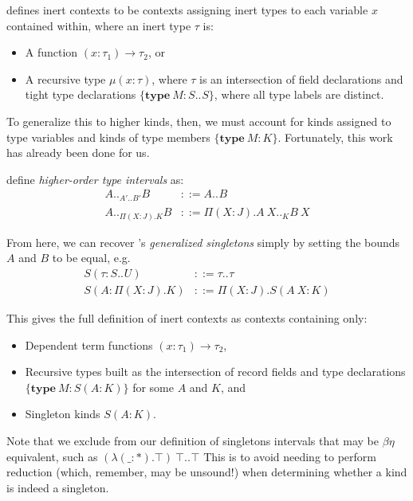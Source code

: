 \documentclass[a4paper, 10pt]{article}
\newcommand{\interval}[3][]{#2 .._{#1} #3}
\newcommand{\KDepArr}[3]{\Pi(#1:#2).#3}
\newcommand{\TDepArr}[3]{(#1:#2) \rightarrow #3}
\newcommand{\objtyp}[3]{\{ \textbf{#1}\ #2 : #3 \}}
\begin{document}
\citet{rapoport2017} defines inert contexts to be contexts assigning inert
types to each variable $x$ contained within, where an inert type $\tau$ is:

\begin{itemize}
  \item A function $\TDepArr{x}{\tau_1}{\tau_2}$, or
  \item A recursive type $\mu(x: \tau)$, where $\tau$ is an intersection of
    field declarations and tight type declarations
    $\objtyp{type}{M}{\interval{S}{S}}$, where all type labels are distinct.
\end{itemize}

To generalize this to higher kinds, then, we must account for kinds assigned to
type variables and kinds of type members $\objtyp{type}{M}{K}$. Fortunately,
this work has already been done for us.

\citet{stucki2021} define \emph{higher-order type intervals} as:
\begin{align*}
  \interval[\interval{A'}{B'}]{A}{B} &::= \interval{A}{B} \\
  \interval[\KDepArr{X}{J}{K}]{A}{B} &::=
    \KDepArr{X}{J}{\interval[K]{A\ X}{B\ X}}
\end{align*}

From here, we can recover \citet{stoneharper2000}'s \emph{generalized
singletons} simply by setting the bounds $A$ and $B$ to be equal, e.g.
\begin{align*}
  S(\tau : \interval{S}{U}) &::= \interval{\tau}{\tau} \\
  S(A : \KDepArr{X}{J}{K}) &::= \KDepArr{X}{J}{S(A\ X : K)}
\end{align*}

This gives the full definition of inert contexts as contexts containing only:
\begin{itemize}
  \item Dependent term functions $\TDepArr{x}{\tau_1}{\tau_2}$,
  \item Recursive types built as the intersection of record fields and type
    declarations $\objtyp{type}{M}{S(A : K)}$ for some $A$ and $K$, and
  \item Singleton kinds $S(A : K)$.
\end{itemize}

Note that we exclude from our definition of singletons intervals that may be
$\beta\eta$ equivalent, such as $\interval{(\lambda (\_:*).\top)\ \top}{\top}$
This is to avoid needing to perform reduction (which, remember, may be
unsound!) when determining whether a kind is indeed a singleton.
\end{document}
